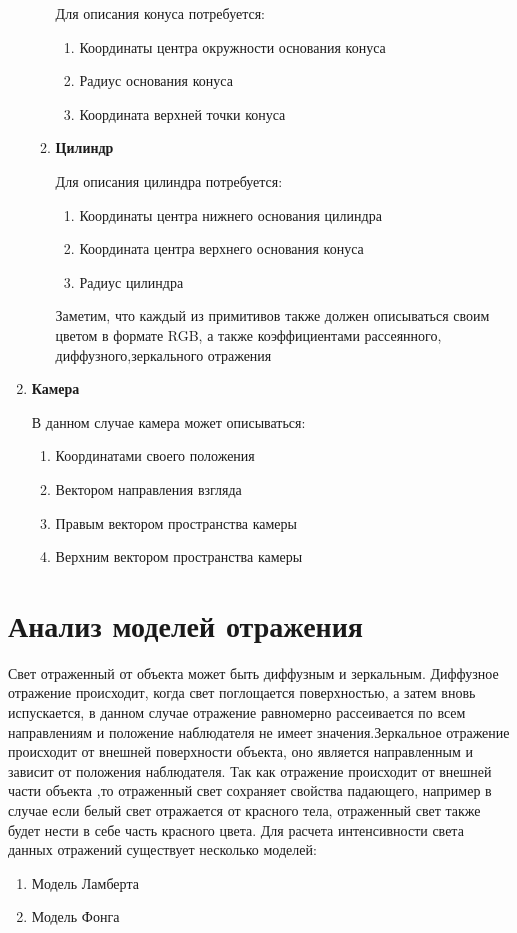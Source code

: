 \begin{enumerate}
\begin{enumerate}[label*=\arabic*.]
		Для описания конуса потребуется:
		\begin{enumerate}[label*=\arabic*.]
			\item Координаты центра окружности основания конуса
			\item Радиус основания конуса
			\item Координата верхней точки конуса
		\end{enumerate}
		\item  \textbf{Цилиндр}
		
		Для описания цилиндра потребуется:
		\begin{enumerate}[label*=\arabic*.]
			\item Координаты центра нижнего основания цилиндра
			\item Координата центра верхнего основания конуса
			\item Радиус цилиндра
		\end{enumerate}
		Заметим, что каждый из примитивов также должен описываться своим цветом в формате RGB, а также
		коэффициентами рассеянного, диффузного,зеркального отражения
	\end{enumerate}

	\item \textbf{Камера}
	
	В данном случае камера может описываться:
	\begin{enumerate}[label*=\arabic*.]
		\item Координатами своего положения
		\item Вектором направления взгляда
		\item Правым вектором пространства камеры
		\item Верхним вектором пространства камеры
	\end{enumerate}
	
\end{enumerate}

\section[Анализ моделей отражения]{Анализ моделей отражения}
\label{sec:reflection_models}
Свет отраженный от объекта может быть диффузным и зеркальным.
Диффузное отражение происходит, когда свет поглощается поверхностью, а затем вновь испускается, в данном случае
отражение равномерно рассеивается по всем направлениям и положение наблюдателя не имеет значения.Зеркальное отражение
происходит от внешней поверхности объекта, оно является направленным и зависит от положения наблюдателя.
Так как отражение происходит от внешней части объекта ,то отраженный свет сохраняет свойства падающего, например в случае если белый свет отражается
от красного тела, отраженный свет также будет нести в себе часть красного цвета.
Для расчета интенсивности света данных отражений существует несколько моделей:
\begin{enumerate}
	\item Модель Ламберта
	\item Модель Фонга \cite{Rodgers}
\end{enumerate}

